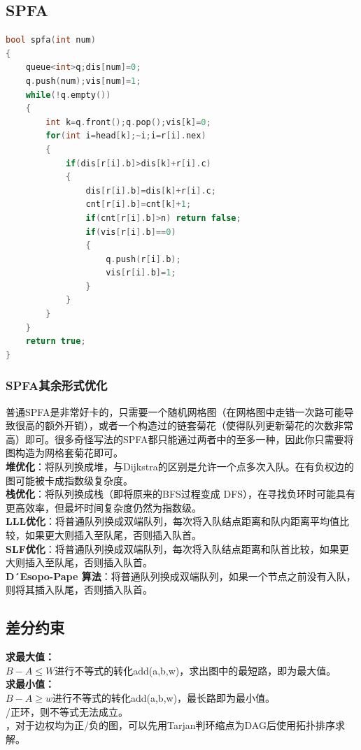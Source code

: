 \documentclass[a4paper]{book}
\begin{document}
\subsection{SPFA}
\begin{lstlisting}[language=C++]
bool spfa(int num)
{
    queue<int>q;dis[num]=0;
    q.push(num);vis[num]=1;
    while(!q.empty())
    {
        int k=q.front();q.pop();vis[k]=0;
        for(int i=head[k];~i;i=r[i].nex)
        {
            if(dis[r[i].b]>dis[k]+r[i].c)
            {
                dis[r[i].b]=dis[k]+r[i].c;
                cnt[r[i].b]=cnt[k]+1;
                if(cnt[r[i].b]>n) return false;
                if(vis[r[i].b]==0)
                {
                    q.push(r[i].b);
                    vis[r[i].b]=1;
                }	
            }
        }
    }
    return true;
}
\end{lstlisting}
\subsubsection{SPFA其余形式优化}
普通SPFA是非常好卡的，只需要一个随机网格图（在网格图中走错一次路可能导致很高的额外开销），或者一个构造过的链套菊花（使得队列更新菊花的次数非常高）即可。很多奇怪写法的SPFA都只能通过两者中的至多一种，因此你只需要将图构造为网格套菊花即可。\\
\indent\textbf{堆优化}：将队列换成堆，与Dijkstra的区别是允许一个点多次入队。在有负权边的图可能被卡成指数级复杂度。\\
\indent\textbf{栈优化}：将队列换成栈（即将原来的BFS过程变成 DFS），在寻找负环时可能具有更高效率，但最坏时间复杂度仍然为指数级。\\
\indent\textbf{LLL优化}：将普通队列换成双端队列，每次将入队结点距离和队内距离平均值比较，如果更大则插入至队尾，否则插入队首。\\
\indent\textbf{SLF优化}：将普通队列换成双端队列，每次将入队结点距离和队首比较，如果更大则插入至队尾，否则插入队首。\\
\indent\textbf{D´Esopo-Pape 算法}：将普通队列换成双端队列，如果一个节点之前没有入队，则将其插入队尾，否则插入队首。

\subsection{差分约束}
\noindent\textbf{求最大值：}\\
$B-A\leq W$进行不等式的转化add(a,b,w)，求出图中的最短路，即为最大值。\\
\noindent\textbf{求最小值：}\\
$B-A\ge w$进行不等式的转化add(a,b,w)，最长路即为最小值。\\
/正环，则不等式无法成立。\\
，对于边权均为正/负的图，可以先用Tarjan判环缩点为DAG后使用拓扑排序求解。
\end{document}
